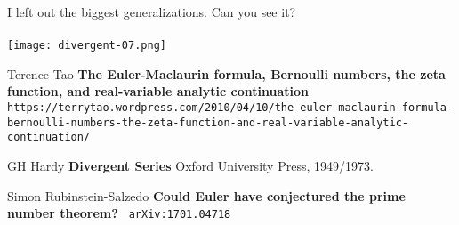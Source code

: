 \documentclass[12pt]{article}
\begin{document}
\noindent I left out the biggest generalizations.  Can you see it?  \\ \\
\texttt{[image: divergent-07.png]}  \\

\vfill



\begin{thebibliography}{}

\item Terence Tao \textbf{The Euler-Maclaurin formula, Bernoulli numbers, the zeta function, and real-variable analytic continuation} 
\texttt{https://terrytao.wordpress.com/2010/04/10/the-euler-maclaurin-formula-bernoulli-numbers-the-zeta-function-and-real-variable-analytic-continuation/}
\item GH Hardy \textbf{Divergent Series}  Oxford University Press, 1949/1973.
\item Simon Rubinstein-Salzedo \textbf{Could Euler have conjectured the prime number theorem?} \texttt{ arXiv:1701.04718}

\end{thebibliography}
\end{document}
